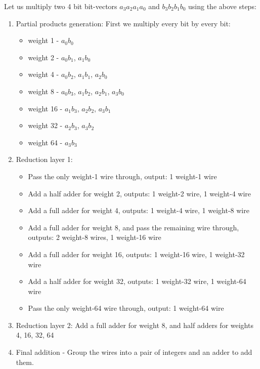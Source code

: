 \begin{example}

Let us multiply two 4 bit bit-vectors $a_3a_2a_1a_0$ and $b_3b_2b_1b_0$ using the above steps:

\begin{enumerate}
\item Partial products generation: First we multiply every bit by every bit:
\begin{itemize}
\item weight 1 - $a_0b_0$
\item weight 2 - $a_0b_1$, $a_1b_0$
\item weight 4 - $a_0b_2$, $a_1b_1$, $a_2b_0$
\item weight 8 - $a_0b_3$, $a_1b_2$, $a_2b_1$, $a_3b_0$
\item weight 16 - $a_1b_3$, $a_2b_2$, $a_3b_1$
\item weight 32 - $a_2b_3$, $a_3b_2$
\item weight 64 - $a_3b_3$
\end{itemize}

\item Reduction layer 1:
\begin{itemize}
\item Pass the only weight-1 wire through, output: 1 weight-1 wire
\item Add a half adder for weight 2, outputs: 1 weight-2 wire, 1 weight-4 wire
\item Add a full adder for weight 4, outputs: 1 weight-4 wire, 1 weight-8 wire
\item Add a full adder for weight 8, and pass the remaining wire through, outputs: 2 weight-8 wires, 1 weight-16 wire
\item Add a full adder for weight 16, outputs: 1 weight-16 wire, 1 weight-32 wire
\item Add a half adder for weight 32, outputs: 1 weight-32 wire, 1 weight-64 wire
\item Pass the only weight-64 wire through, output: 1 weight-64 wire
\end{itemize}

\item Reduction layer 2: Add a full adder for weight 8, and half adders for weights 4, 16, 32, 64
\item Final addition - Group the wires into a pair of integers and an adder to add them.
\end{enumerate}
\end{example}

